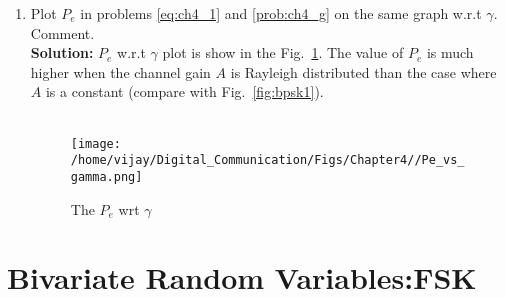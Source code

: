 \documentclass[journal,10pt,twocolumn]{IEEEtran}
\newcounter{Chapcounter}
\numberwithin{equation}{subsection}
\numberwithin{figure}{subsection}
\renewcommand\thesection{\theChapcounter.\arabic{section}}
\newcommand\figref{Fig.~\ref}
\newcommand{\solution}{\noindent \textbf{Solution: }}
\renewcommand\thesection{\arabic{section}}
\renewcommand\thesubsection{\thesection.\arabic{subsection}}
\begin{document}
\begin{enumerate}[label=\thesubsection.\arabic*,ref=\thesubsection.\arabic{figure}]
\item
Plot $P_e$ in problems \ref{eq:ch4_1} and \ref{prob:ch4_g} on the same graph w.r.t $\gamma$.  Comment. \\
\solution $P_e$ w.r.t $\gamma$ plot is show in the \figref{fig:Pe_gamma1}. The value of $P_e$ is much higher when the channel %
gain $A$ is Rayleigh distributed than the case where $A$ is a constant (compare with \figref{fig:bpsk1}).\\


\\	

\begin{figure}[!ht]
\centering
\texttt{[image: /home/vijay/Digital\_Communication/Figs/Chapter4//Pe\_vs\_gamma.png]}      
\caption{The $P_e$ wrt $\gamma$ }
\label{fig:Pe_gamma1}
\end{figure}

\end{enumerate}

\section{Bivariate Random Variables:FSK}
\end{document}
